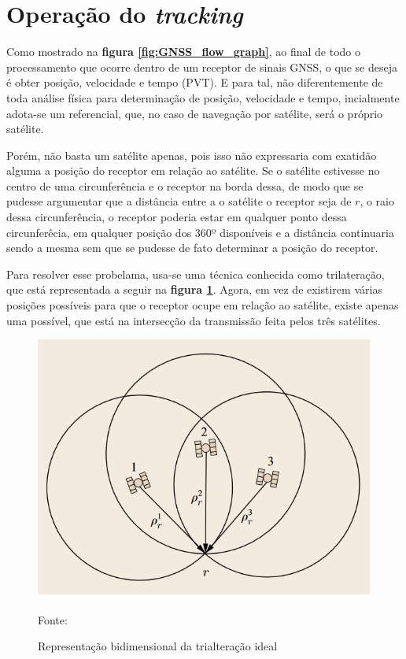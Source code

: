 \section{Operação do \textit{tracking}}

Como mostrado na \textbf{figura \ref{fig:GNSS_flow_graph}}, ao final de todo o processamento que ocorre dentro de um receptor de sinais GNSS, o que se deseja é obter posição, velocidade e tempo (PVT). E para tal, não diferentemente de toda análise física para determinação de posição, velocidade e tempo, incialmente adota-se um referencial, que, no caso de navegação por satélite, será o próprio satélite.

Porém, não basta um satélite apenas, pois isso não expressaria com exatidão alguma a posição do receptor em relação ao satélite. Se o satélite estivesse no centro de uma circunferência e o receptor na borda dessa, de modo que se pudesse argumentar que a distância entre a o satélite o receptor seja de $r$, o raio dessa circunferência, o receptor poderia estar em qualquer ponto dessa circunferêcia, em qualquer posição dos 360º disponíveis e a distância continuaria sendo a mesma sem que se pudesse de fato determinar a posição do receptor.

Para resolver esse probelama, usa-se uma técnica conhecida como trilateração, que está representada a seguir na \textbf{figura \ref{fig:Trilateração}}. Agora, em vez de existirem várias posições possíveis para que o receptor ocupe em relação ao satélite, existe apenas uma possível, que está na intersecção da transmissão feita pelos três satélites. 

\begin{figure}[ht]
    \centering
    \caption{Representação bidimensional da trialteração ideal}
    \includegraphics[width = 0.6 \textwidth]{figuras/Trilateração.png}

    Fonte: \cite{Teunissen2017}
    \label{fig:Trilateração}
\end{figure}

